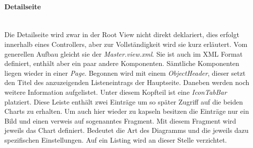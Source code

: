 \paragraph{Detailseite}$\;$ \\
Die Detailseite wird zwar in der Root View nicht direkt deklariert, dies erfolgt innerhalb eines Controllers, aber zur Vollständigkeit wird sie kurz erläutert. Vom generellen Aufbau gleicht sie der \textit{Master.view.xml}. Sie ist auch im XML Format definiert, enthält aber ein paar andere Komponenten. Sämtliche Komponenten liegen wieder in einer \textit{Page}. Begonnen wird mit einem \textit{ObjectHeader}, dieser setzt den Titel des anzuzeigenden Listeneintrags der Hauptseite. Daneben werden noch weitere Information aufgelistet. Unter diesem Kopfteil ist eine \textit{IconTabBar} platziert. Diese Leiste enthält zwei Einträge um so später Zugriff auf die beiden Charts zu erhalten. Um auch hier wieder zu kapseln besitzen die Einträge nur ein Bild und einen verweis auf sogenanntes Fragment. Mit diesem Fragment wird jeweils das Chart definiert. Bedeutet die Art des Diagramms und die jeweils dazu spezifischen Einstellungen. Auf ein Listing wird an dieser Stelle verzichtet.

